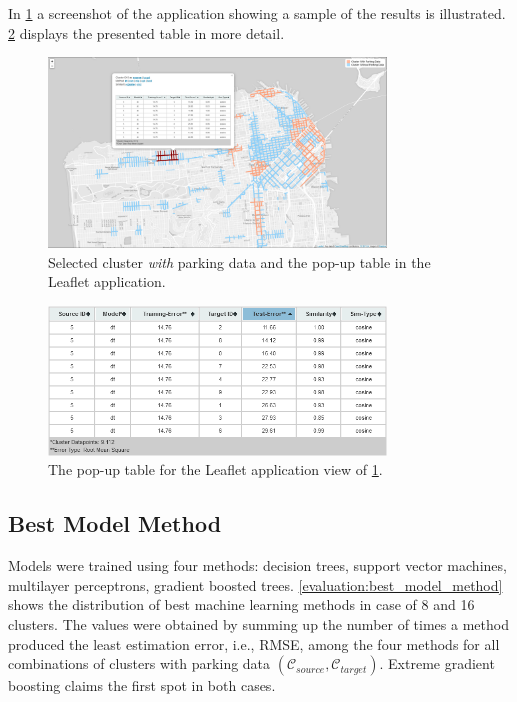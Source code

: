 \label{evaluation:training_testing_errors}
In \ref{fig:cwith} a screenshot of the application showing a sample of the results is illustrated. \ref{fig:cwith_table} displays the presented table in more detail.

\begin{figure}[!ht]
	\centering
	\includegraphics[width=0.8\textwidth]{graphics/cwith_source_dt_cosine.png}
	\caption{Selected cluster \textit{with} parking data and the pop-up table in the Leaflet application.}
	\label{fig:cwith}
\end{figure}

\begin{figure}[!ht]
	\centering
	\includegraphics[width=0.8\textwidth]{graphics/cwith_source_dt_cosine_table.png}
	\caption{The pop-up table for the Leaflet application view of  \ref{fig:cwith}.}
	\label{fig:cwith_table}
\end{figure}

\subsection{Best Model Method}
\label{evaluation:best_model}
Models were trained using four methods: decision trees, support vector machines, multilayer perceptrons, gradient boosted trees. \ref{evaluation:best_model_method} shows the distribution of best machine learning methods in case of 8 and 16 clusters.
The values were obtained by summing up the number of times a method produced the least estimation error, i.e., RMSE, among the four methods for all combinations of clusters with parking data $(\mathcal{C}_{source}, \mathcal{C}_{target})$.
Extreme gradient boosting claims the first spot in both cases.


